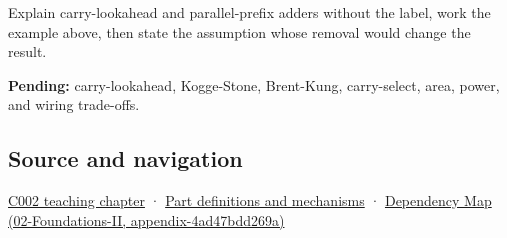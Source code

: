 Explain carry-lookahead and parallel-prefix adders without the label, work the example above, then state the assumption whose removal would change the result.

\textbf{Pending:} carry-lookahead, Kogge-Stone, Brent-Kung, carry-select, area, power, and wiring trade-offs.

\subsection{Source and navigation}\label{appendix-b5c46b2d94ff-source-and-navigation}

\hyperref[01-foundations-i-ch001-arithmetic-becomes-a-policy]{C002 teaching chapter} · \hyperref[appendix-fd090d982a15]{Part definitions and mechanisms} · \href{../02-Foundations-II/main.pdf\#nameddest=appendix-4ad47bdd269a}{Dependency Map (02-Foundations-II, appendix-4ad47bdd269a)}
